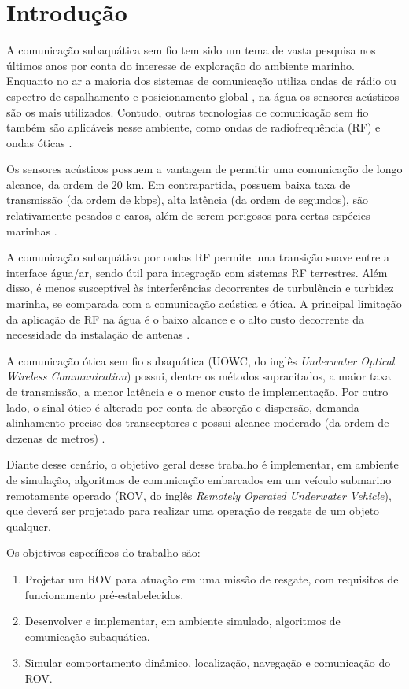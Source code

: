 \section{Introdução}
\label{sec:introducao}


A comunicação subaquática sem fio tem sido um tema de vasta pesquisa nos últimos anos por conta do interesse de exploração do ambiente marinho. Enquanto no ar a maioria dos sistemas de comunicação utiliza ondas de rádio ou espectro de espalhamento e posicionamento global \cite{Paull2014}, na água os sensores acústicos são os mais utilizados. Contudo, outras tecnologias de comunicação sem fio também são aplicáveis nesse ambiente, como ondas de radiofrequência (RF) e ondas óticas \cite{Ur-Rehman2018}.

Os sensores acústicos possuem a vantagem de permitir uma comunicação de longo alcance, da ordem de 20 km. Em contrapartida, possuem baixa taxa de transmissão (da ordem de kbps), alta latência (da ordem de segundos), são relativamente pesados e caros, além de serem perigosos para certas espécies marinhas \cite{Ur-Rehman2018}.

A comunicação subaquática por ondas RF permite uma transição suave entre a interface água/ar, sendo útil para integração com sistemas RF terrestres. Além disso, é menos susceptível às interferências decorrentes de turbulência e turbidez marinha, se comparada com a comunicação acústica e ótica. A principal limitação da aplicação de RF na água é o baixo alcance e o alto custo decorrente da necessidade da instalação de antenas \cite{Ur-Rehman2018}.

A comunicação ótica sem fio subaquática (UOWC, do inglês \textit{Underwater Optical Wireless Communication}) possui, dentre os métodos supracitados, a maior taxa de transmissão, a menor latência e o menor custo de implementação. Por outro lado, o sinal ótico é alterado por conta de absorção e dispersão, demanda alinhamento preciso dos transceptores e possui alcance moderado (da ordem de dezenas de metros) \cite{Ur-Rehman2018}.

Diante desse cenário, o objetivo geral desse trabalho é implementar, em ambiente de simulação, algoritmos de comunicação embarcados em um veículo submarino remotamente operado (ROV, do inglês \textit{Remotely Operated Underwater Vehicle}), que deverá ser projetado para realizar uma operação de resgate de um objeto qualquer.

Os objetivos específicos do trabalho são:
\begin{enumerate}
	\item Projetar um ROV para atuação em uma missão de resgate, com requisitos de funcionamento pré-estabelecidos.
	\item Desenvolver e implementar, em ambiente simulado, algoritmos de comunicação subaquática.
	\item Simular comportamento dinâmico, localização, navegação e comunicação do ROV.
\end{enumerate}

